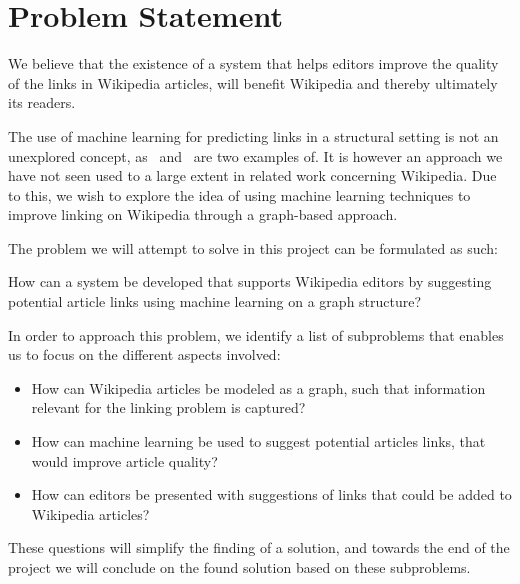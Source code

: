 \section{Problem Statement}\label{sec:problem_statement}
We believe that the existence of a system that helps editors improve the quality of the links in Wikipedia articles, will benefit Wikipedia and thereby ultimately its readers.

The use of machine learning for predicting links in a structural setting is not an unexplored concept, as~\cite{tang2015line} and~\cite{al2006link} are two examples of. It is however an approach we have not seen used to a large extent in related work concerning Wikipedia. Due to this, we wish to explore the idea of using machine learning techniques to improve linking on Wikipedia through a graph-based approach.

The problem we will attempt to solve in this project can be formulated as such:
\newcommand{\problemstatement}{\vspace{1ex} %
\begin{formal}
How can a system\todo{software solution} be developed that supports Wikipedia editors by suggesting potential article links using machine learning on a graph structure?
\end{formal}}

\problemstatement

In order to approach this problem, we identify a list of subproblems that enables us to focus on the different aspects involved:

\newcommand{\subproblemone}{How can Wikipedia articles be modeled as a graph, such that information relevant for the linking problem is captured?}
\newcommand{\subproblemtwo}{How can machine learning be used to suggest potential articles links, that would improve article quality?}
\newcommand{\subproblemthree}{How can editors be presented with suggestions of links that could be added to Wikipedia articles?}

\newcommand{\subproblems}{
\begin{itemize}
  \item \subproblemone
  \item \subproblemtwo
  \item \subproblemthree
\end{itemize}}

\subproblems

These questions will simplify the finding of a solution, and towards the end of the project we will conclude on the found solution based on these subproblems.

